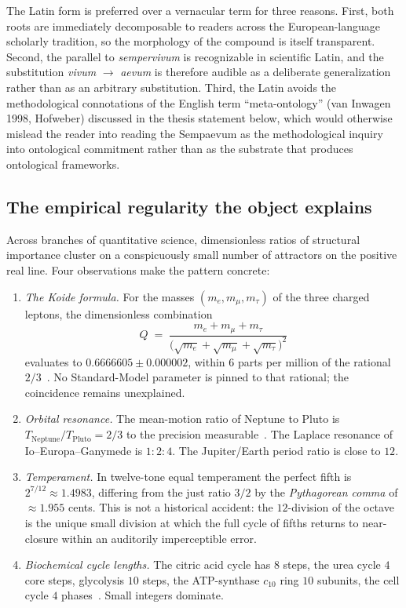 \documentclass[11pt,a4paper]{article}
\theoremstyle{definition}
\theoremstyle{remark}
\begin{document}
The Latin form is preferred over a vernacular term for three reasons. First, both roots are immediately decomposable to readers across the European-language scholarly tradition, so the morphology of the compound is itself transparent. Second, the parallel to \emph{sempervivum} is recognizable in scientific Latin, and the substitution \emph{vivum} $\to$ \emph{aevum} is therefore audible as a deliberate generalization rather than as an arbitrary substitution. Third, the Latin avoids the methodological connotations of the English term ``meta-ontology'' (van Inwagen 1998, Hofweber) discussed in the thesis statement below, which would otherwise mislead the reader into reading the Sempaevum as the methodological inquiry into ontological commitment rather than as the substrate that produces ontological frameworks.

\subsection{The empirical regularity the object explains}

Across branches of quantitative science, dimensionless ratios of structural importance cluster on a conspicuously small number of attractors on the positive real line. Four observations make the pattern concrete:

\begin{enumerate}[leftmargin=*]
\item \emph{The Koide formula.} For the masses $(m_e,m_{\mu},m_{\tau})$ of the three charged leptons, the dimensionless combination
\[
Q \;=\; \frac{m_e+m_{\mu}+m_{\tau}}{\bigl(\sqrt{m_e}+\sqrt{m_{\mu}}+\sqrt{m_{\tau}}\bigr)^{2}}
\]
evaluates to $0.6666605\pm 0.000002$, within $6$ parts per million of the rational $2/3$~\cite{Koide1982}. No Standard-Model parameter is pinned to that rational; the coincidence remains unexplained.
\item \emph{Orbital resonance.} The mean-motion ratio of Neptune to Pluto is $T_{\mathrm{Neptune}}/T_{\mathrm{Pluto}}=2/3$ to the precision measurable~\cite{CohenHubbard1965}. The Laplace resonance of Io--Europa--Ganymede is $1{:}2{:}4$. The Jupiter/Earth period ratio is close to $12$.
\item \emph{Temperament.} In twelve-tone equal temperament the perfect fifth is $2^{7/12}\approx 1.4983$, differing from the just ratio $3/2$ by the \emph{Pythagorean comma} of $\approx 1.955$ cents. This is not a historical accident: the $12$-division of the octave is the unique small division at which the full cycle of fifths returns to near-closure within an auditorily imperceptible error.
\item \emph{Biochemical cycle lengths.} The citric acid cycle has $8$ steps, the urea cycle $4$ core steps, glycolysis $10$ steps, the ATP-synthase $c_{10}$ ring $10$ subunits, the cell cycle $4$ phases~\cite{Alberts}. Small integers dominate.
\end{enumerate}
\end{document}
